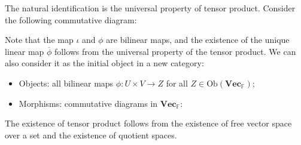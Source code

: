 \documentclass[
	11pt, %
	fleqn, %
	a4paper, %
]{LegrandOrangeBook}
\renewcommand{\bar}[1]{\overline{#1}} %
\newcommand{\F}{\mathbb{F}} %
\newcommand{\Vect}{\textbf{Vec}} %
\newcommand{\Ob}[1]{\text{Ob}(#1)} %
\begin{document}
The natural identification is the universal property of tensor product. Consider the following commutative diagram:
\begin{center}
\end{center}
Note that the map $\iota$ and $\phi$ are bilinear maps, and the existence of the unique linear map $\bar{\phi}$ follows from the universal property of the tensor product. We can also consider it as the initial object in a new category:
\begin{itemize}
    \item Objects: all bilinear maps $\phi : U \times V \to Z$ for all $Z \in \Ob{\Vect_{\F}}$;
    \item Morphisms: commutative diagrams in $\Vect_{\F}$:
\end{itemize}
\begin{center}
\end{center}

The existence of tensor product follows from the existence of free vector space over a set and the existence of quotient spaces. 
\end{document}
